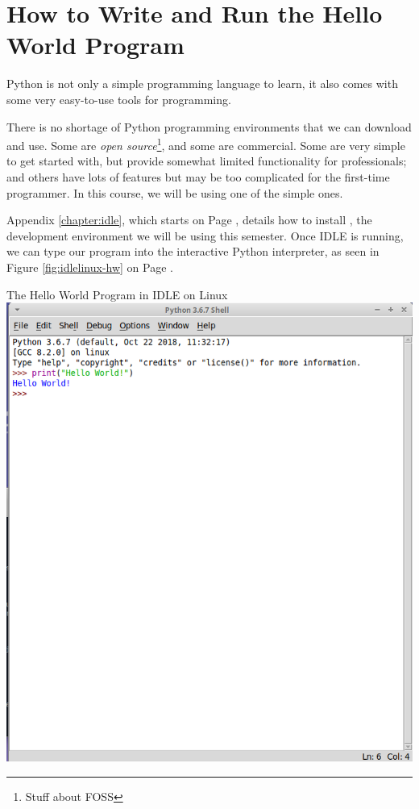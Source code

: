 \section{How to Write and Run the Hello World Program}

Python is not only a simple programming language to learn, it also comes with some very easy-to-use tools for programming.

There is no shortage of Python programming environments that we can download and use.  Some are \textit{open source}\footnote{Stuff about FOSS}, and some are commercial.  Some are very simple to get started with, but provide somewhat limited functionality for professionals; and others have lots of features but may be too complicated for the first-time programmer.  In this course, we will be using one of the simple ones.

Appendix \ref{chapter:idle}, which starts on Page \pageref{chapter:idle}, details how to install , the development environment we will be using this semester.  Once IDLE is running, we can type our program into the interactive Python interpreter, as seen in Figure \ref{fig:idlelinux-hw} on Page \pageref{fig:idlelinux-hw}.

\begin{myfigure}[label=fig:idlelinux-hw]{The Hello World Program in IDLE on Linux}
    \centering
    \includegraphics[scale=0.6]{screenshots/idlelinux-hw.png}
\end{myfigure}

